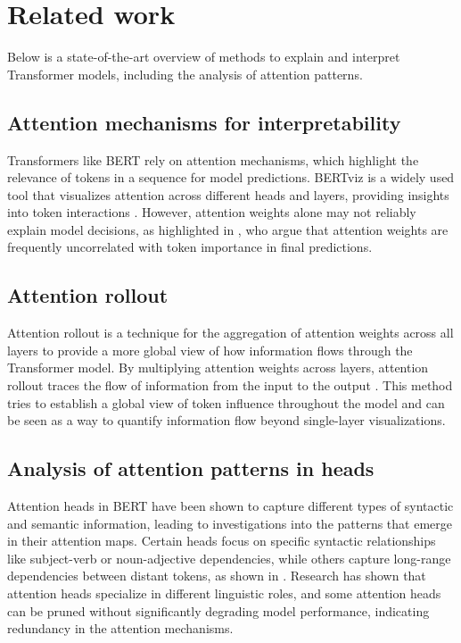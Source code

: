 \documentclass[11pt,a4paper,reqno]{amsart} %
\theoremstyle{definition}
\numberwithin{equation}{section}          %
\begin{document}
\section{Related work}
Below is a state-of-the-art overview of methods to explain and interpret Transformer models, including the analysis of attention patterns.

\subsection{Attention mechanisms for interpretability}
Transformers like BERT rely on attention mechanisms, which highlight the relevance of tokens in a sequence for model predictions. BERTviz is a widely used tool that visualizes attention across different heads and layers, providing insights into token interactions \cite{vig2019}. However, attention weights alone may not reliably explain model decisions, as highlighted in \cite{jain2019}, who argue that attention weights are frequently uncorrelated with token importance in final predictions.

\subsection{Attention rollout}
Attention rollout is a technique for the aggregation of attention weights across all layers to provide a more global view of how information flows through the Transformer model. 
By multiplying attention weights across layers, attention rollout traces the flow of information from the input to the output \cite{abnar2020}. This method tries to establish a global view of token influence throughout the model and can be seen as a way to quantify information flow beyond single-layer visualizations.

\subsection{Analysis of attention patterns in heads}
Attention heads in BERT have been shown to capture different types of syntactic and semantic information, leading to investigations into the patterns that emerge in their attention maps. Certain heads focus on specific syntactic relationships like subject-verb or noun-adjective dependencies, while others capture long-range dependencies between distant tokens, as shown in \cite{clark2019}. Research has shown that attention heads specialize in different linguistic roles, and some attention heads can be pruned without significantly degrading model performance, indicating redundancy in the attention mechanisms.
\end{document}
